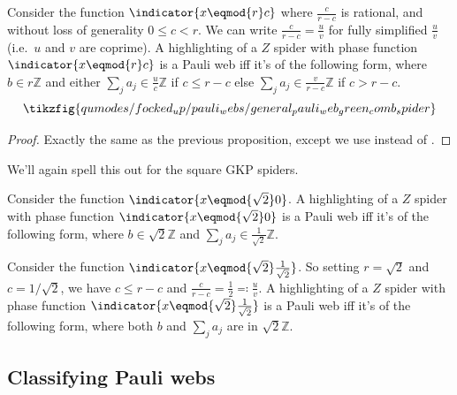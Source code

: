 \begin{proposition}\label{thm:general_pauli_web_green_gkp_like_spider}
    Consider the function $\indicator{x \eqmod{r} c}$ where $\frac{c}{r - c}$ is rational, and without loss of generality $0 \leq c < r$.
    We can write $\frac{c}{r - c} = \frac{u}{v}$ for fully simplified $\frac{u}{v}$ (i.e.\ $u$ and $v$ are coprime).
    A highlighting of a $Z$ spider with phase function $\indicator{x \eqmod{r} c}$ is a Pauli web iff it's of the following form, where $b \in r\mathbb{Z}$ and either $\sum_j a_j \in \frac{u}{c}\mathbb{Z}$ if $c \leq r - c$ else $\sum_j a_j \in \frac{v}{r - c}\mathbb{Z}$ if $c > r - c$.
    \begin{equation}\label{eq:general_pauli_web_green_gkp_like_spider}
    \tikzfig{qumodes/focked_up/pauli_webs/general_pauli_web_green_comb_spider}
    \end{equation}
    \begin{proof}
        Exactly the same as the previous proposition, except we use  instead of .
    \end{proof}
\end{proposition}

We'll again spell this out for the square GKP spiders.

\begin{example}\label{ex:general_pauli_web_square_GKP_spider_0}
    Consider the function $\indicator{x \eqmod{\sqrt{2}} 0}$.
    A highlighting of a $Z$ spider with phase function $\indicator{x \eqmod{\sqrt{2}} 0}$ is a Pauli web iff it's of the following form, where $b \in \sqrt{2}\mathbb{Z}$ and $\sum_j a_j \in \frac{1}{\sqrt{2}}\mathbb{Z}$.
\end{example}

\begin{example}\label{ex:general_pauli_web_square_GKP_spider_1}
    Consider the function $\indicator{x \eqmod{\sqrt{2}} \frac{1}{\sqrt{2}}}$.
    So setting $r = \sqrt{2}$ and $c = 1/\sqrt{2}$, we have $c \leq r - c$ and $\frac{c}{r - c} = \frac{1}{2} \eqqcolon \frac{u}{v}$.
    A highlighting of a $Z$ spider with phase function $\indicator{x \eqmod{\sqrt{2}} \frac{1}{\sqrt{2}}}$ is a Pauli web iff it's of the following form, where both $b$ and $\sum_j a_j$ are in $\sqrt{2}\mathbb{Z}$.
\end{example}

\subsection{Classifying Pauli webs}

